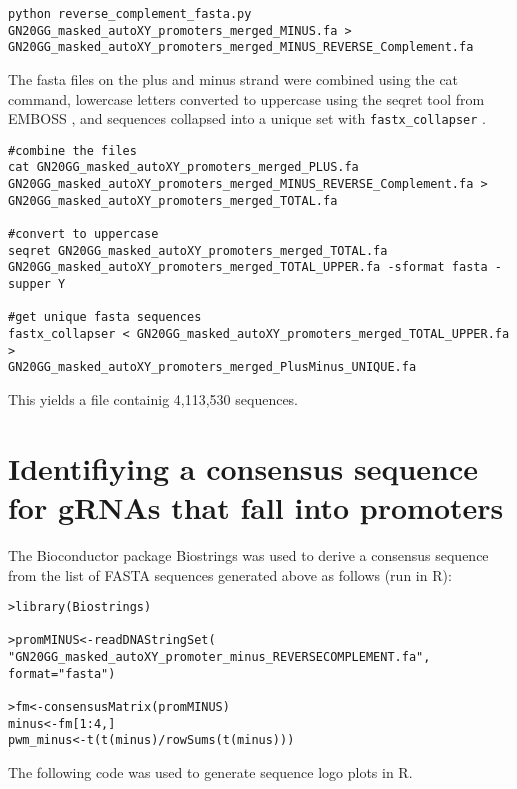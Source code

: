 \begin{lstlisting}
python reverse_complement_fasta.py GN20GG_masked_autoXY_promoters_merged_MINUS.fa >
GN20GG_masked_autoXY_promoters_merged_MINUS_REVERSE_Complement.fa
\end{lstlisting}

The fasta files on the plus and minus strand were combined using the cat command, lowercase letters converted to uppercase using the seqret tool from EMBOSS \cite{Rice:2000wr}, and sequences collapsed into a unique set with \verb|fastx_collapser| \cite{Hannon:Online} . 

\begin{lstlisting}
#combine the files
cat GN20GG_masked_autoXY_promoters_merged_PLUS.fa 
GN20GG_masked_autoXY_promoters_merged_MINUS_REVERSE_Complement.fa >
GN20GG_masked_autoXY_promoters_merged_TOTAL.fa

#convert to uppercase 
seqret GN20GG_masked_autoXY_promoters_merged_TOTAL.fa 
GN20GG_masked_autoXY_promoters_merged_TOTAL_UPPER.fa -sformat fasta -supper Y   

#get unique fasta sequences
fastx_collapser < GN20GG_masked_autoXY_promoters_merged_TOTAL_UPPER.fa >
GN20GG_masked_autoXY_promoters_merged_PlusMinus_UNIQUE.fa

\end{lstlisting}

This yields a file containig 4,113,530 sequences.

\section{Identifiying a consensus sequence for gRNAs that fall into promoters}

The Bioconductor package Biostrings \cite{Biostrings} was used to derive a consensus sequence from the list of FASTA sequences generated above as follows (run in R):

\begin{lstlisting}
>library(Biostrings)

>promMINUS<-readDNAStringSet(
"GN20GG_masked_autoXY_promoter_minus_REVERSECOMPLEMENT.fa", format="fasta")  

>fm<-consensusMatrix(promMINUS) 
minus<-fm[1:4,] 
pwm_minus<-t(t(minus)/rowSums(t(minus)))  

\end{lstlisting}

The following code  was used to generate sequence logo plots \cite{Berry:2006hv} in R.

